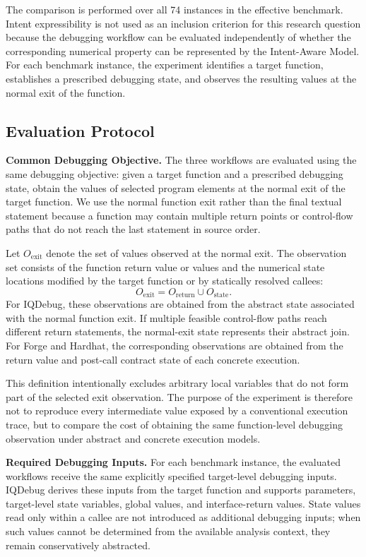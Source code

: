 \documentclass[11pt,oneside]{report}
\theoremstyle{plain}
\theoremstyle{definition}
\theoremstyle{remark}
\begin{document}
The comparison is performed over all 74 instances in the effective benchmark. Intent expressibility is not used as an inclusion criterion for this research question because the debugging workflow can be evaluated independently of whether the corresponding numerical property can be represented by the Intent-Aware Model. For each benchmark instance, the experiment identifies a target function, establishes a prescribed debugging state, and observes the resulting values at the normal exit of the function.

\subsection{Evaluation Protocol}
\label{subsec:eval:rq1:protocol}

\noindent\textbf{Common Debugging Objective.}
The three workflows are evaluated using the same debugging objective: given a target function and a prescribed debugging state, obtain the values of selected program elements at the normal exit of the target function. We use the normal function exit rather than the final textual statement because a function may contain multiple return points or control-flow paths that do not reach the last statement in source order.

Let \(O_{\mathrm{exit}}\) denote the set of values observed at the normal exit. The observation set consists of the function return value or values and the numerical state locations modified by the target function or by statically resolved callees:
\[
O_{\mathrm{exit}}
=
O_{\mathrm{return}}
\cup
O_{\mathrm{state}}.
\]
For IQDebug, these observations are obtained from the abstract state associated with the normal function exit. If multiple feasible control-flow paths reach different return statements, the normal-exit state represents their abstract join. For Forge and Hardhat, the corresponding observations are obtained from the return value and post-call contract state of each concrete execution.

This definition intentionally excludes arbitrary local variables that do not form part of the selected exit observation. The purpose of the experiment is therefore not to reproduce every intermediate value exposed by a conventional execution trace, but to compare the cost of obtaining the same function-level debugging observation under abstract and concrete execution models.

\medskip
\noindent\textbf{Required Debugging Inputs.}
For each benchmark instance, the evaluated workflows receive the same explicitly specified target-level debugging inputs. IQDebug derives these inputs from the target function and supports parameters, target-level state variables, global values, and interface-return values. State values read only within a callee are not introduced as additional debugging inputs; when such values cannot be determined from the available analysis context, they remain conservatively abstracted.
\end{document}

